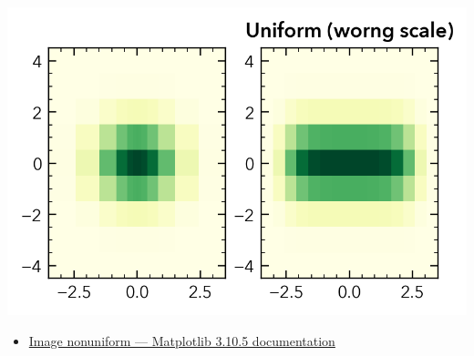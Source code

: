 \documentclass[a4paper, 10pt, notitlepage, twocolumn, uplatex, oneside, dvipdfmx]{jsarticle}
\begin{document}
\begin{center}
\includegraphics[width=1.0\linewidth]{./obipy-resources/params_image_nonuniformimage.png}
\end{center}

\begin{itemize}
\item \href{https://matplotlib.org/stable/gallery/images\_contours\_and\_fields/image\_nonuniform.html}{Image nonuniform — Matplotlib 3.10.5 documentation}
\end{itemize}
\end{document}
